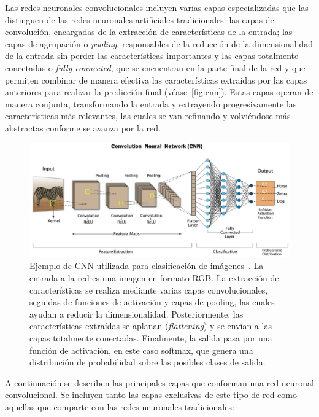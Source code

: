 Las redes neuronales convolucionales incluyen varias capas especializadas que las distinguen de las redes neuronales artificiales tradicionales: las capas de convolución, encargadas de la extracción de características de la entrada; las capas de agrupación o \emph{pooling}, responsables de la reducción de la dimensionalidad de la entrada sin perder las características importantes y las capas totalmente conectadas o \emph{fully connected}, que se encuentran en la parte final de la red y que permiten combinar de manera efectiva las características extraídas por las capas anteriores para realizar la predicción final (véase~\autoref{fig:cnn}). Estas capas operan de manera conjunta, transformando la entrada y extrayendo progresivamente las características más relevantes, las cuales se van refinando y volviéndose más abstractas conforme se avanza por la red.\newline

\begin{figure}[h]
    \centering
    \includegraphics[width=0.8\linewidth]{img/cnn.png}
    \caption[Ejemplo de CNN utilizada para clasificación de imágenes~\cite{CNNSwapna}.]{Ejemplo de CNN utilizada para clasificación de imágenes~\cite{CNNSwapna}. La entrada a la red es una imagen en formato RGB. La extracción de características se realiza mediante varias capas convolucionales, seguidas de funciones de activación y capas de pooling, las cuales ayudan a reducir la dimensionalidad. Posteriormente, las características extraídas se aplanan (\textit{flattening}) y se envían a las capas totalmente conectadas. Finalmente, la salida pasa por una función de activación, en este caso softmax, que genera una distribución de probabilidad sobre las posibles clases de salida.}\label{fig:cnn}
\end{figure}

A continuación se describen las principales capas que conforman una red neuronal convolucional. Se incluyen tanto las capas exclusivas de este tipo de red como aquellas que comparte con las redes neuronales tradicionales:


